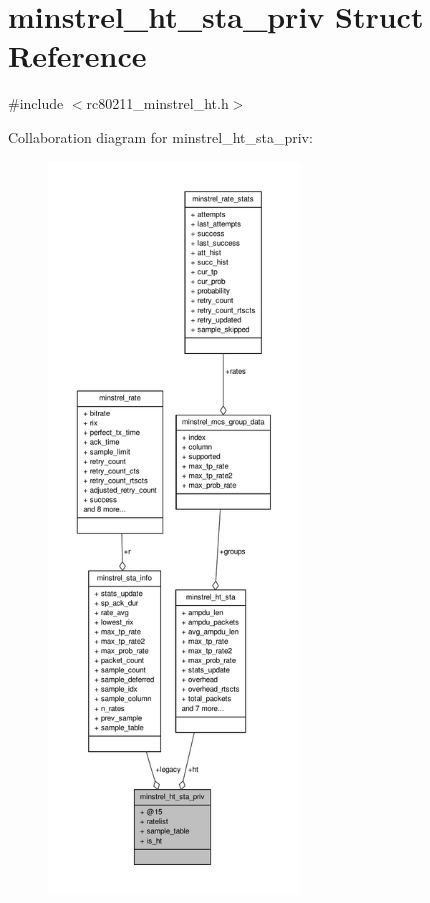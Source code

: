\hypertarget{structminstrel__ht__sta__priv}{\section{minstrel\-\_\-ht\-\_\-sta\-\_\-priv Struct Reference}
\label{structminstrel__ht__sta__priv}
}


{\ttfamily \#include $<$rc80211\-\_\-minstrel\-\_\-ht.\-h$>$}



Collaboration diagram for minstrel\-\_\-ht\-\_\-sta\-\_\-priv\-:
\nopagebreak
\begin{figure}[H]
\begin{center}
\leavevmode
\includegraphics[height=550pt]{structminstrel__ht__sta__priv__coll__graph}
\end{center}
\end{figure}

